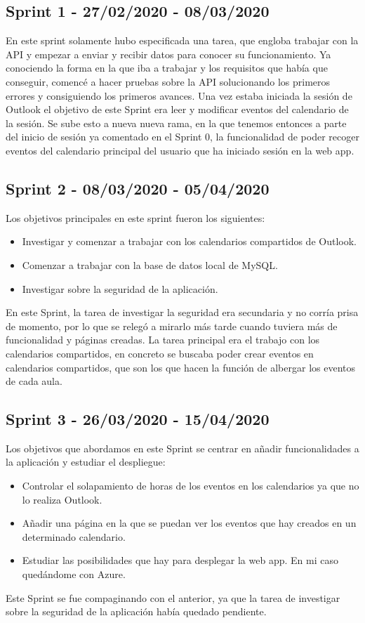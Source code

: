 \subsection{Sprint 1 - 27/02/2020 - 08/03/2020}
En este sprint solamente hubo especificada una tarea, que engloba trabajar con la API y empezar a enviar y recibir datos para conocer su funcionamiento. Ya conociendo la forma en la que iba a trabajar y los requisitos que había que conseguir, comencé a hacer pruebas sobre la API solucionando los primeros errores y consiguiendo los primeros avances.\newline
Una vez estaba iniciada la sesión de Outlook el objetivo de este Sprint era leer y modificar eventos del calendario de la sesión. Se sube esto a nueva nueva rama, en la que tenemos entonces a parte del inicio de sesión ya comentado en el Sprint 0, la funcionalidad de poder recoger eventos del calendario principal del usuario que ha iniciado sesión en la web app.

\subsection{Sprint 2 - 08/03/2020 - 05/04/2020}
Los objetivos principales en este sprint fueron los siguientes:
\begin{itemize}
    \item Investigar y comenzar a trabajar con los calendarios compartidos de Outlook.
    \item Comenzar a trabajar con la base de datos local de MySQL.
    \item Investigar sobre la seguridad de la aplicación.
\end{itemize}
En este Sprint, la tarea de investigar la seguridad era secundaria y no corría prisa de momento, por lo que se relegó a mirarlo más tarde cuando tuviera más de funcionalidad y páginas creadas. La tarea principal era el trabajo con los calendarios compartidos, en concreto se buscaba poder crear eventos en calendarios compartidos, que son los que hacen la función de albergar los eventos de cada aula.

\subsection{Sprint 3 - 26/03/2020 - 15/04/2020}
Los objetivos que abordamos en este Sprint se centrar en añadir funcionalidades a la aplicación y estudiar el despliegue:
\begin{itemize}
    \item Controlar el solapamiento de horas de los eventos en los calendarios ya que no lo realiza Outlook.
    \item Añadir una página en la que se puedan ver los eventos que hay creados en un determinado calendario.
    \item Estudiar las posibilidades que hay para desplegar la web app. En mi caso quedándome con Azure.
\end{itemize}
Este Sprint se fue compaginando con el anterior, ya que la tarea de investigar sobre la seguridad de la aplicación había quedado pendiente.
